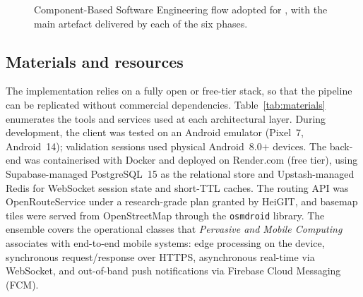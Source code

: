 \documentclass[a4paper,fleqn]{cas-sc}
\begin{document}
	\begin{figure}[t]
		\centering
		\caption{Component-Based Software Engineering flow adopted for \RUTAI{}, with the main artefact delivered by each of the six phases.}
		\label{fig:cbse}
	\end{figure}
	
	\subsection{Materials and resources}\label{sec:materials}
	
	The implementation relies on a fully open or free-tier stack, so that the pipeline can be replicated without commercial dependencies. Table~\ref{tab:materials} enumerates the tools and services used at each architectural layer. During development, the client was tested on an Android emulator (Pixel~7, Android~14); validation sessions used physical Android~8.0$+$ devices. The back-end was containerised with Docker and deployed on Render.com (free tier), using Supabase-managed PostgreSQL~15 as the relational store and Upstash-managed Redis for WebSocket session state and short-TTL caches. The routing API was OpenRouteService under a research-grade plan granted by HeiGIT, and basemap tiles were served from OpenStreetMap \citep{vargasmunoz2021osm} through the \texttt{osmdroid} library. The ensemble covers the operational classes that \emph{Pervasive and Mobile Computing} associates with end-to-end mobile systems: edge processing on the device, synchronous request/response over HTTPS, asynchronous real-time via WebSocket, and out-of-band push notifications via Firebase Cloud Messaging (FCM).
	
\end{document}

